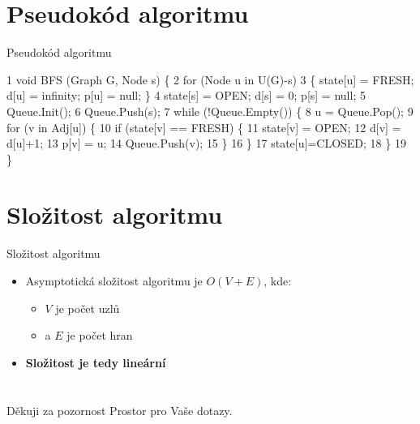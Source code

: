 \documentclass{beamer}
\begin{document}
\section{Pseudokód algoritmu}
\begin{frame}[fragile]{Pseudokód algoritmu}
    \fontsize{10pt}{7.2}\selectfont
    \begin{semiverbatim}
 1 void BFS (Graph G, Node s) \{   
 2   for (Node u in U(G)-s)
 3     \{ state[u] = FRESH; d[u] = infinity; p[u] = null; \}
 4   state[s] = OPEN; d[s] = 0; p[s] = null;
 5   Queue.Init();
 6   Queue.Push(s);
 7   while (!Queue.Empty()) \{
 8     u = Queue.Pop();
 9     for (v in Adj[u]) \{
10       if (state[v] == FRESH) \{
11         state[v] = OPEN;
12         d[v] = d[u]+1;
13         p[v] = u;
14         Queue.Push(v); 
15       \}
16     \}
17     state[u]=CLOSED;
18   \}
19 \}
    \end{semiverbatim}
\end{frame}

\section{Složitost algoritmu}
\begin{frame}{Složitost algoritmu}
	\begin{itemize}
		\item
		Asymptotická složitost algoritmu je \alert{$O(V + E)$}, kde:
		\begin{itemize}
		    \item 
		    $V$ je počet uzlů
		    \item
		    a $E$ je počet hran
		\end{itemize}
		\item
		\textbf{Složitost je tedy \alert{lineární}}
	\end{itemize}
\end{frame}

\section*{}
\begin{frame}{Děkuji za pozornost}
	Prostor pro Vaše dotazy.
\end{frame}
\end{document}
